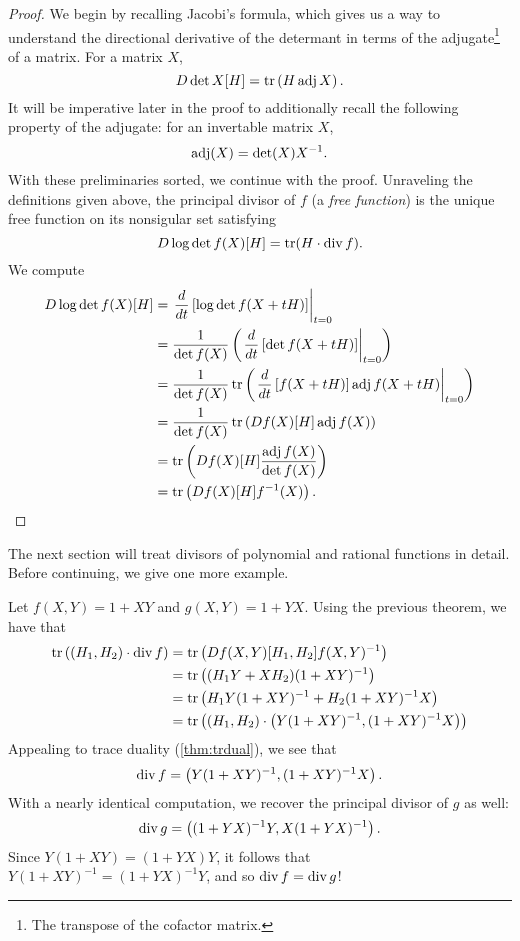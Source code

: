 \begin{proof}
  We begin by recalling Jacobi's formula, which gives us a way to understand the
  directional derivative of the determant in terms of the adjugate\footnote{The
    transpose of the cofactor matrix.}
  of a matrix. For a matrix \(X\),
  \[
    D \det X [H] = \operatorname{tr} \left( H \operatorname{adj} X \right).
  \]
  It will be imperative later in the proof to additionally recall the following property of
  the adjugate: for an invertable matrix \(X\),
  \[
    \operatorname{adj} (X) = \det(X) X ^{-1}.
  \]
  With these preliminaries sorted, we continue with the proof.
  Unraveling the definitions given above, the principal divisor of \(f\) (a
  \emph{free function}) is the unique free function on its nonsigular set satisfying
  \[
    D \log \det f (X)[H] = \operatorname{tr} (H \cdot \operatorname{div} f).
  \]
  We compute
  \begin{align*}
    D \log \det f(X)[H] &=\left. \frac{d}{dt} \left[\log \det f(X+tH) \right]\right|_{t=0} \\
                        &= \frac{1}{\det f(X)} \left(\left. \frac{d}{dt} \left[ \det f(X+tH)\right]\right|_{t=0}\right)\\
                        &= \frac{1}{\det f(X)} \operatorname{tr}\left(\left. \frac{d}{dt} \left[ f(X+tH)\right] \operatorname{adj} f(X+tH)\right|_{t=0}\right)\\
                        &= \frac{1}{\det f(X)} \operatorname{tr}\left(Df(X)[H] \operatorname{adj} f(X)\right)\\
                        &= \operatorname{tr} \left( Df(X)[H] \frac{\operatorname{adj} f(X)}{\det f(X)}\right) \\
                        &= \operatorname{tr} \left( Df(X)[H] f ^{-1}(X) \right).
  \end{align*}
\end{proof}

The next section will treat divisors of polynomial and rational functions in
detail. Before continuing, we give one more example.

\begin{example}
  Let \(f(X,Y) = 1+XY\) and \(g(X,Y) =1+YX\). Using the previous theorem, we
  have that
  \begin{align*}
    \operatorname{tr} \left( (H_1,H_2) \cdot \operatorname{div} f \right)
      &= \operatorname{tr} \left(Df(X,Y)[H_1,H_2] f(X,Y) ^{-1}\right)\\
      &= \operatorname{tr} \left( (H_1Y + X H_2) (1+XY) ^{-1}\right) \\
      &= \operatorname{tr} \left( H_1Y(1+XY)^{-1} + H_2(1+XY)^{-1}X \right)\\
    &= \operatorname{tr} \left( (H_1,H_2) \cdot \left(Y(1+XY)^{-1},(1+XY)^{-1}X\right) \right)
  \end{align*}
  Appealing to trace duality (\cref{thm:trdual}), we see that
  \[
    \operatorname{div} f = \left( Y(1+XY)^{-1},(1+XY)^{-1}X \right).
  \]
  With a nearly identical computation, we recover the principal divisor of \(g\)
  as well:
  \[
    \operatorname{div} g  = \left( (1+YX)^{-1}Y,X(1+YX)^{-1} \right).
  \]
  Since \(Y(1+XY)=(1+YX)Y\), it follows that
  \(Y(1+XY)^{-1}= (1+YX) ^{-1}Y\), and so \(\operatorname{div} f = \operatorname{div} g\)!
\end{example}

